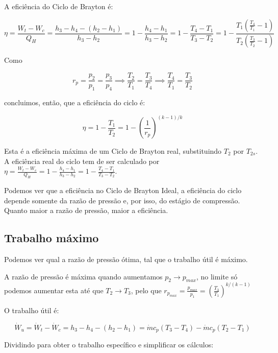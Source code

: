 A eficiência do Ciclo de Brayton é:

\begin{equation*}
    \eta = \frac{W_t - W_c}{Q_H} = \frac{h_3 - h_4 - (h_2 - h_1)}{h_3 - h_2} = 1 - \frac{h_4 - h_1}{h_3 - h_2} = 1 - \frac{T_4 - T_1}{T_3 - T_2} = 1 - \frac{T_1 \left(\frac{T_4}{T_1} -1\right)}{T_2 \left(\frac{T_3}{T_2} -1\right)}
\end{equation*}

Como

\begin{equation*}
    r_p = \frac{p_2}{p_1} = \frac{p_3}{p_4} \implies \frac{T_2}{T_1} = \frac{T_3}{T_4} \implies \frac{T_4}{T_1} = \frac{T_3}{T_2}
\end{equation*}

concluimos, então, que a eficiência do ciclo é:

\begin{equation}
    \eta = 1 - \frac{T_1}{T_2} = 1 - \left(\frac{1}{r_p}\right)^{(k-1)/k}
\end{equation}

Esta é a eficiência máxima de um Ciclo de Brayton real, substituindo $T_2$ por $T_{2s}$. A eficiência real do ciclo tem de ser calculado por $\eta = \frac{W_t - W_c}{Q_H} = 1 - \frac{h_4 - h_1}{h_3 - h_2} = 1 - \frac{T_4 - T_1}{T_3 - T_2}$. 

Podemos ver que a eficiência no Ciclo de Brayton Ideal, a eficiência do ciclo depende somente da razão de pressão e, por isso, do estágio de compressão. Quanto maior a razão de pressão, maior a eficiência.

\subsection{Trabalho máximo}

Podemos ver qual a razão de pressão ótima, tal que o trabalho útil é máximo.

A razão de pressão é máxima quando aumentamos $p_2 \to p_{max}$, no limite só podemos aumentar esta até que $T_2 \to T_3$, pelo que $r_{p_{max}} = \frac{p_{max}}{p_1} = \left(\frac{T_3}{T_1}\right)^{k/(k-1)}$

O trabalho útil é:

\begin{equation*}
    \dot{W}_u = \dot{W}_t - \dot{W}_c = h_3 - h_4 - (h_2 - h_1) = \dot{m} c_p (T_3 - T_4) - \dot{m} c_p (T_2 - T_1)
\end{equation*}

Dividindo para obter o trabalho específico e simplificar os cálculos:

